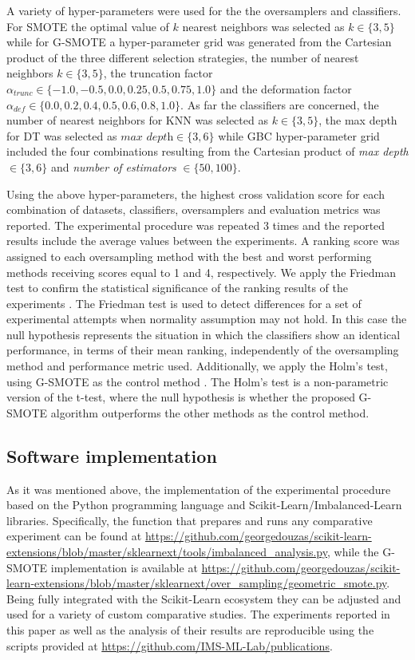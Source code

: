 \documentclass[parskip=full]{scrartcl}
\begin{document}
A variety of hyper-parameters were used for the the oversamplers and
classifiers. For SMOTE the optimal value of \( k \) nearest neighbors was
selected as \( k \in \{ 3, 5 \} \) while for G-SMOTE a hyper-parameter grid was
generated from the Cartesian product of the three different selection
strategies, the number of nearest neighbors \(k \in \{ 3, 5 \} \), the
truncation factor \( \alpha_{trunc} \in \{ -1.0, -0.5, 0.0, 0.25, 0.5, 0.75 ,
1.0 \} \) and the deformation factor \( \alpha_{def} \in \{ 0.0, 0.2, 0.4, 0.5,
0.6, 0.8, 1.0 \} \). As far the classifiers are concerned, the number of nearest
neighbors for KNN was selected as \( k \in \{ 3, 5 \} \),  the max depth for DT
was selected as \( \textit{max depth} \in \{ 3, 6 \} \) while GBC
hyper-parameter grid included the four combinations resulting from the Cartesian
product of  \textit{max depth} \( \in \{ 3 , 6 \} \) and \textit{number of
estimators} \( \in \{50, 100\} \).

Using the above hyper-parameters, the highest cross validation score for each
combination of datasets, classifiers, oversamplers and evaluation metrics was
reported. The experimental procedure was repeated 3 times and the reported
results include the average values between the experiments. A ranking score was
assigned to each oversampling method with the best and worst performing methods
receiving scores equal to 1 and 4, respectively. We apply the Friedman test to
confirm the statistical significance of the ranking results of the experiments
\cite{Guyon2003}. The Friedman test is used to detect differences for a set of
experimental attempts when normality assumption may not hold. In this case the
null hypothesis represents the situation in which the classifiers show an
identical performance, in terms of their mean ranking, independently of the
oversampling method and performance metric used.  Additionally, we apply the
Holm’s test, using G-SMOTE as the control method \cite{Guyon2003}. The Holm’s
test is a non-parametric version of the t-test, where the null hypothesis is
whether the proposed G-SMOTE algorithm outperforms the other methods as the
control method.

\subsection{Software implementation}

As it was mentioned above, the implementation of the experimental procedure
based on the Python programming language and Scikit-Learn/Imbalanced-Learn
libraries. Specifically, the function that prepares and runs any comparative
experiment can be found at
\url{https://github.com/georgedouzas/scikit-learn-extensions/blob/master/sklearnext/tools/imbalanced_analysis.py},
while the G-SMOTE implementation is available at
\url{https://github.com/georgedouzas/scikit-learn-extensions/blob/master/sklearnext/over_sampling/geometric_smote.py}.
Being fully integrated with the Scikit-Learn ecosystem they can be adjusted and
used for a variety of custom comparative studies. The experiments reported in
this paper as well as the analysis of their results are reproducible using the
scripts provided at \url{https://github.com/IMS-ML-Lab/publications}.
\end{document}
